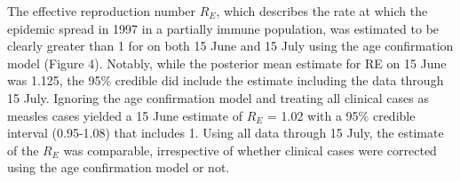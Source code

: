 The effective reproduction number $R_E$, which describes the rate at which the epidemic spread in 1997 in a partially immune population, was estimated to be clearly greater than 1 for on both 15 June and 15 July using the age confirmation model (Figure 4). Notably, while the posterior mean
estimate for RE on 15 June was 1.125, the 95\% credible did include the estimate including the data through 15 July. Ignoring the age
confirmation model and treating all clinical cases as measles cases yielded a 15 June estimate of $R_E$ = 1.02 with a 95\% credible interval
(0.95-1.08) that includes 1. Using all data through 15 July, the estimate of the $R_E$ was comparable, irrespective of whether clinical cases were corrected using the age confirmation model or not.